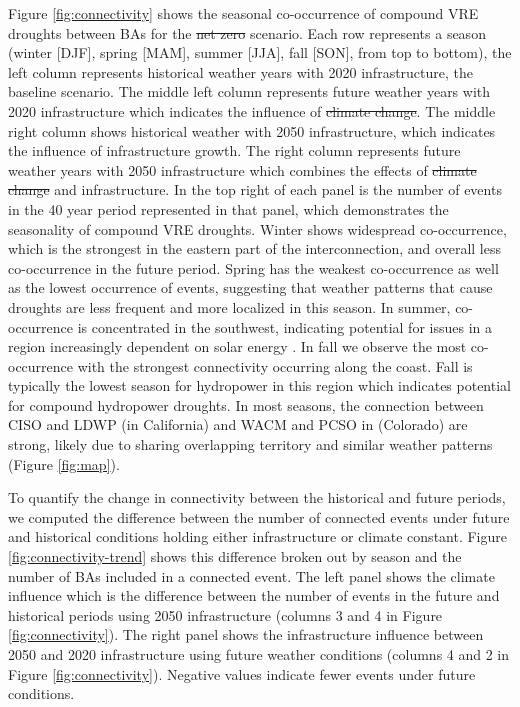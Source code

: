 \documentclass{agujournal2019}
\providecommand{\DIFadd}[1]{{\protect\color{blue}\uwave{#1}}} %
\providecommand{\DIFdel}[1]{{\protect\color{red}\sout{#1}}} %
\providecommand{\DIFaddbegin}{} %
\providecommand{\DIFaddend}{} %
\providecommand{\DIFdelbegin}{} %
\providecommand{\DIFdelend}{} %
\begin{document}
Figure \ref{fig:connectivity} shows the seasonal co-occurrence of compound VRE droughts between BAs for the \DIFdelbegin \DIFdel{net zero }\DIFdelend \DIFaddbegin \DIFadd{high renewable }\DIFaddend scenario. Each row represents a season (winter [DJF], spring [MAM], summer [JJA], fall [SON], from top to bottom), the left column represents historical weather years with 2020 infrastructure, the baseline scenario. The middle left column represents future weather years with 2020 infrastructure which indicates the influence of \DIFdelbegin \DIFdel{climate change}\DIFdelend \DIFaddbegin \DIFadd{future climate}\DIFaddend . The middle right column shows historical weather with 2050 infrastructure, which indicates the influence of infrastructure growth. The right column represents future weather years with 2050 infrastructure which combines the effects of \DIFdelbegin \DIFdel{climate change }\DIFdelend \DIFaddbegin \DIFadd{future climate }\DIFaddend and infrastructure. In the top right of each panel is the number of events in the 40 year period represented in that panel, which demonstrates the seasonality of compound VRE droughts. Winter shows widespread co-occurrence, which is the strongest in the eastern part of the interconnection, and overall less co-occurrence in the future period. Spring has the weakest co-occurrence as well as the lowest occurrence of events, suggesting that weather patterns that cause droughts are less frequent and more localized in this season. In summer, co-occurrence is concentrated in the southwest, indicating potential for issues in a region increasingly dependent on solar energy \cite{Tabassum_2021}. In fall we observe the most co-occurrence with the strongest connectivity occurring along the coast. Fall is typically the lowest season for hydropower in this region which indicates potential for compound hydropower droughts. In most seasons, the connection between CISO and LDWP (in California) and WACM and PCSO in (Colorado) are strong, likely due to sharing overlapping territory and similar weather patterns (Figure \ref{fig:map}).

To quantify the change in connectivity between the historical and future periods, we computed the difference between the number of connected events under future and historical conditions holding either infrastructure or climate constant. Figure \ref{fig:connectivity-trend} shows this difference broken out by season and the number of BAs included in a connected event. The left panel shows the climate influence which is the difference between the number of events in the future and historical periods using 2050 infrastructure (columns 3 and 4 in Figure \ref{fig:connectivity}). The right panel shows the infrastructure influence between 2050 and 2020 infrastructure using future weather conditions (columns 4 and 2 in Figure \ref{fig:connectivity}). Negative values indicate fewer events under future conditions. 
\end{document}
